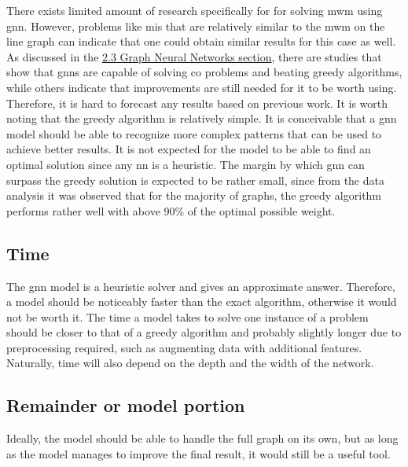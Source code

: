 There exists limited amount of research specifically for for solving \gls{mwm} using \gls{gnn}. However, problems like \gls{mis} that are relatively similar to the \gls{mwm} on the line graph  can indicate that one could obtain similar results for this case as well. As discussed in the \hyperref[sec:graphneuralnetworks]{2.3 Graph Neural Networks section}, there are studies that show that \gls{gnn}s are capable of solving \gls{co} problems and beating greedy algorithms, while others indicate that improvements are still needed for it to be worth using. Therefore, it is hard to forecast any results based on previous work. It is worth noting that the greedy algorithm is relatively simple. It is conceivable that a \gls{gnn} model should be able to recognize more complex patterns that can be used to achieve better results. It is not expected for the model to be able to find an optimal solution since any \gls{nn} is a heuristic. The margin by which \gls{gnn} can surpass the greedy solution is expected to be rather small, since from the data analysis it was observed that for the majority of graphs, the greedy algorithm performs rather well with above 90\% of the optimal possible weight.

\subsection{Time}

The \gls{gnn} model is a heuristic solver and gives an approximate answer. Therefore, a model should be noticeably faster than the exact algorithm, otherwise it would not be worth it. The time a model takes to solve one instance of a problem should be closer to that of a greedy algorithm and probably slightly longer due to preprocessing required, such as augmenting data with additional features. Naturally, time will also depend on the depth and the width of the network.

\subsection{Remainder or model portion}

Ideally, the model should be able to handle the full graph on its own, but as long as the model manages to improve the final result, it would still be a useful tool.